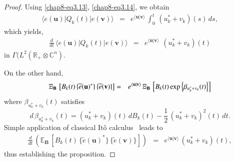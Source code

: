 \begin{proof}
Using \eqref{chap8-eq3.13}, \eqref{chap8-eq3.14}, we obtain 
\begin{eqnarray} 
\langle e(\mathbf{u})\vert Q_k(t)\vert e(\mathbf{v})\rangle &=& e^{\langle \mathbf{u}\vert \mathbf{v}\rangle}\,\int_{0}^{t}\, (u^*_k+v_k)(s)\, ds, \label{chap8-eq5.7}
\end{eqnarray}
which yields, 
\begin{eqnarray}
\frac{d}{dt}\,\langle e(\mathbf{u})\vert Q_k(t)\vert e(\mathbf{v})\rangle &=& e^{\langle \mathbf{u}\vert \mathbf{v}\rangle}\ \, (u^*_k+v_k)(t) \label{chap8-eq5.8}
\end{eqnarray}
in $\Gamma(L^2(\mathbb{R}_+\otimes \mathbb{C}^n).$

On the other hand,   
\begin{eqnarray} 
\mathbb{E}_{\mathbf{B}}\,\left[B_k(t)\,\{\widetilde{e}(\mathbf{u})^{*}\}\, \{\widetilde{e}(\mathbf{v})\}\right]&=& e^{\langle \mathbf{u}\vert \mathbf{v}\rangle}\, \mathbb{E}_{\mathbf{B}}\, \left[B_k(t)\, {\rm exp}\left\{\beta_{u_k^*+v_k}(t)\right\}\right]  \label{chap8-eq5.9}
\end{eqnarray}  
where  $\beta_{u_k^*+v_k}(t)$ satisfies   
\begin{equation}
d\, \beta_{u_k^*+v_k}(t)= (u^*_k+v_k)(t)\, dB_k(t) - \frac{1}{2} \, (u^*_k+v_k)^2(t)\, dt.  \label{chap8-eq5.10}
\end{equation}
Simple application of classical It{\^o} calculus~\cite{chap8-key38} leads to
\begin{eqnarray}
\frac{d}{dt}\, \left(\mathbb{E}_{\mathbf{B}}\,\left[B_k(t)\,\{\widetilde{e}(\mathbf{u})^{*}\}\, \{\widetilde{e}(\mathbf{v})\}\right]\right)&=& e^{\langle \mathbf{u}\vert \mathbf{v}\rangle}\, (u^*_k+v_k)(t), \label{chap8-eq5.11}
\end{eqnarray}
thus establishing the proposition.
\end{proof}

